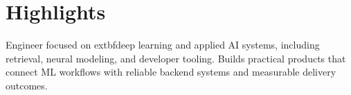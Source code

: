 \section{Highlights}

\begin{onecolentry}
    \begin{highlightsforbulletentries}

    \item Engineer focused on 	extbf{deep learning} and applied AI systems, including retrieval, neural modeling, and developer tooling. Builds practical products that connect ML workflows with reliable backend systems and measurable delivery outcomes.

    \end{highlightsforbulletentries}
\end{onecolentry}